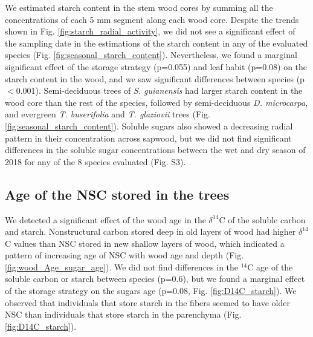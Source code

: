 \documentclass{article}
\begin{document}
We estimated starch content in the stem wood cores by summing all the concentrations of each 5 mm segment along each wood core. Despite the trends shown in Fig. \ref{fig:starch_radial_activity}, we did not see a significant effect of the sampling date in the estimations of the starch content in any of the evaluated species (Fig. \ref{fig:seasonal_starch_content}). Nevertheless, we found a marginal significant effect of the storage strategy (p=0.055) and leaf habit (p=0.08) on the starch content in the wood, and we saw significant differences between species (p$<$0.001). Semi-deciduous trees of \textit{S. guianensis} had larger starch content in the wood core than the rest of the species, followed by semi-deciduous \textit{D. microcarpa}, and evergreen \textit{T. buserifolia} and \textit{T. glaziovii} trees (Fig. \ref{fig:seasonal_starch_content}). Soluble sugars also showed a decreasing radial pattern in their concentration across sapwood, but we did not find significant differences in the soluble sugar concentrations between the wet and dry season of 2018 for any of the 8 species evaluated (Fig. S3).



\subsection{ Age of the NSC stored in the trees}

We detected a significant effect of the wood age in the $\delta^{14}$C of the soluble carbon and starch. Nonstructural carbon stored deep in old layers of wood had higher $\delta^{14}$C values than NSC stored in new shallow layers of wood, which indicated a pattern of increasing age of NSC with wood age and depth (Fig. \ref{fig:wood_Age_sugar_age}). We did not find differences in the $^{14}$C age of the soluble carbon or starch between species (p=0.6), but we found a marginal effect of the storage strategy on the sugars age (p=0.08, Fig. \ref{fig:D14C_starch}). We observed that individuals that store starch in the fibers seemed to have older NSC than individuals that store starch in the parenchyma (Fig. \ref{fig:D14C_starch}).
\end{document}
